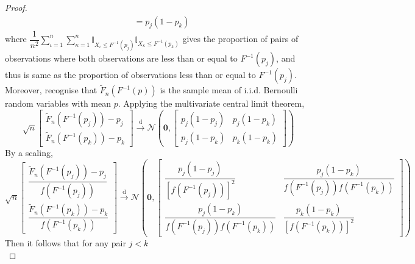 \documentclass[11pt]{report} %
\begin{document}
\begin{proof}
\begin{align}
&= p_{j}\left(1 - p_{k}\right)
\end{align}
where $\dfrac{1}{n^{2}}\sum_{\iota = 1}^{n}\sum_{\kappa = 1}^{n}\mathbb{I}_{X_{\iota} \leq F^{-1}\left(p_{j}\right)}\mathbb{I}_{X_{\kappa} \leq F^{-1}\left(p_{k}\right)}$ gives the proportion of pairs of observations where both observations are less than or equal to $F^{-1}\left(p_{j}\right)$, and thus is same as the proportion of observations less than or equal to $F^{-1}\left(p_{j}\right)$. Moreover, recognise that $\widetilde{F}_{n}\left(F^{-1}\left(p\right)\right)$ is the sample mean of i.i.d. Bernoulli random variables with mean $p$. Applying the multivariate central limit theorem, 
\begin{equation}
\sqrt{n}\begin{bmatrix}
\widetilde{F}_{n}\left(F^{-1}\left(p_{j}\right)\right) - p_{j} \\
\widetilde{F}_{n}\left(F^{-1}\left(p_{k}\right)\right) - p_{k}
\end{bmatrix} \overset{\mathrm{d}}{\to} \mathcal{N}\left(\mathbf{0}, \begin{bmatrix}
p_{j}\left(1 - p_{j}\right) & p_{j}\left(1 - p_{k}\right) \\ p_{j}\left(1 - p_{k}\right) & p_{k}\left(1 - p_{k}\right)
\end{bmatrix}\right)
\end{equation}
By a scaling,
\begin{equation}
\sqrt{n}\begin{bmatrix}
\dfrac{\widetilde{F}_{n}\left(F^{-1}\left(p_{j}\right)\right) - p_{j}}{f\left(F^{-1}\left(p_{j}\right)\right)} \\
\dfrac{\widetilde{F}_{n}\left(F^{-1}\left(p_{k}\right)\right) - p_{k}}{f\left(F^{-1}\left(p_{k}\right)\right)}
\end{bmatrix} \overset{\mathrm{d}}{\to} \mathcal{N}\left(\mathbf{0}, \begin{bmatrix}
\dfrac{p_{j}\left(1 - p_{j}\right)}{\left[f\left(F^{-1}\left(p_{j}\right)\right)\right]^{2}} & \dfrac{p_{j}\left(1 - p_{k}\right)}{f\left(F^{-1}\left(p_{j}\right)\right)f\left(F^{-1}\left(p_{k}\right)\right)} \\ \dfrac{p_{j}\left(1 - p_{k}\right)}{f\left(F^{-1}\left(p_{j}\right)\right)f\left(F^{-1}\left(p_{k}\right)\right)} & \dfrac{p_{k}\left(1 - p_{k}\right)}{\left[f\left(F^{-1}\left(p_{k}\right)\right)\right]^{2}} 
\end{bmatrix}\right)
\end{equation}
Then it follows that for any pair $j < k$
\begin{equation}

\end{equation}
\end{proof}
\end{document}
